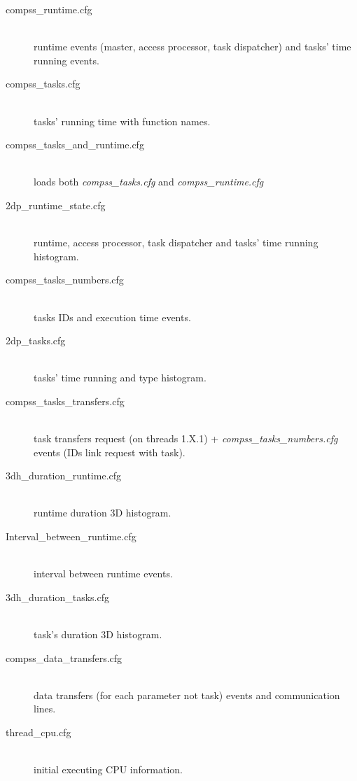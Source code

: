 \begin{description}
\item [compss\_runtime.cfg] \hfill \\ runtime events (master, access processor, task dispatcher) and tasks' time running events.
\item [compss\_tasks.cfg] \hfill \\ tasks' running time with function names.
\item [compss\_tasks\_and\_runtime.cfg] \hfill \\ loads both \textit{compss\_tasks.cfg} and \textit{compss\_runtime.cfg}
\item [2dp\_runtime\_state.cfg] \hfill \\ runtime, access processor, task dispatcher and tasks' time running histogram.
\item [compss\_tasks\_numbers.cfg] \hfill \\ tasks IDs and execution time events.
\item [2dp\_tasks.cfg] \hfill \\ tasks' time running and type histogram.
\item [compss\_tasks\_transfers.cfg] \hfill \\ task transfers request (on threads 1.X.1) + \textit{compss\_tasks\_numbers.cfg} events (IDs link request with task).
\item [3dh\_duration\_runtime.cfg] \hfill \\ runtime duration 3D histogram.
\item [Interval\_between\_runtime.cfg] \hfill \\ interval between runtime events.
\item [3dh\_duration\_tasks.cfg] \hfill \\ task's duration 3D histogram.
\item [compss\_data\_transfers.cfg] \hfill \\ data transfers (for each parameter not task) events and communication lines.
\item [thread\_cpu.cfg] \hfill \\ initial executing CPU information.
\end{description}
